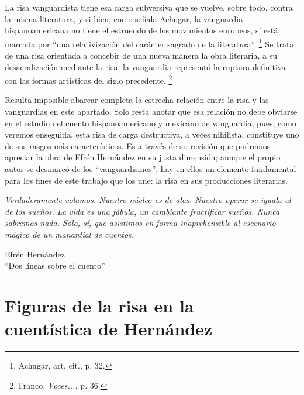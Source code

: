 \documentclass[14pt,twoside,final]{extbook} %
\let\oldfootnote\footnote
\renewcommand\footnote[1]{%
\oldfootnote{\hspace{1mm}#1}}
\begin{document}
La risa vanguardista tiene esa carga subversiva que se vuelve, sobre todo, contra la misma literatura, y si bien, como señala Achugar, la vanguardia hispanoamericana no tiene el estruendo de los movimientos europeos, sí está marcada por ``una relativización del carácter sagrado de la literatura''.\footnote{Achugar, art. cit., p. 32.} Se trata de una risa orientada a concebir de una nueva manera la obra literaria, a su desacralización mediante la risa; la vanguardia representó la ruptura definitiva con las formas artísticas del siglo precedente.\footnote{Franco, \emph{Voces...,} p. 36.}

Resulta imposible abarcar completa la estrecha relación entre la risa y las vanguardias en este apartado. Solo resta anotar que esa relación no debe obviarse en el estudio del cuento hispanoamericano y mexicano de vanguardia, pues, como veremos enseguida, esta risa de carga destructiva, a veces nihilista, constituye uno de sus rasgos más característicos. Es a través de su revisión que podremos apreciar la obra de Efrén Hernández en su justa dimensión; aunque el propio autor se desmarcó de los ``vanguardismos'', hay en ellos un elemento fundamental para los fines de este trabajo que los une: la risa en sus producciones literarias.
\cleardoublepage
\newpage
\pagestyle{empty}
\vspace*{42pt}
\begin{flushright}
\begin{minipage}{7.5cm} %
\emph{Verdaderamente volamos. Nuestro núcleo es de alas. Nuestro operar se iguala al de los sueños. La vida es una fábula, un cambiante fructificar sueños. Nunca sabremos nada. Sólo, sí, que asistimos en forma inaprehensible al escenario mágico de un manantial de cuentos.}
\begin{flushright}
Efrén Hernández \\ ``Dos líneas sobre el cuento''
\end{flushright}
\end{minipage}
\end{flushright}
\chapter[\textsc{Figuras de la risa en la cuentística de Hernández}]{Figuras de la risa en la \\ cuentística de Hernández}\label{ch:figuras-de-la-risa-en-la-cuentistica-de-hernandez}
\BgThispage
\thispagestyle{empty}
\pagestyle{fancy}
\fancyhf{} %
\fancyhead[RO,LE]{\thepage}
\renewcommand{\headrulewidth}{0pt}
\end{document}
